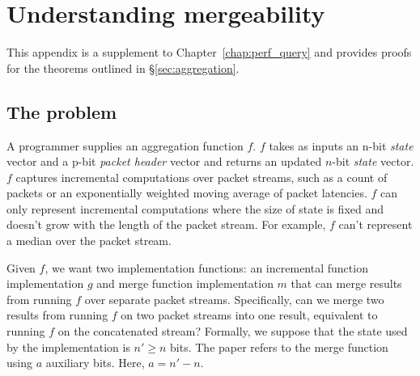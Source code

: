 \chapter{Understanding mergeability}
\label{s:app:merge}

%

This appendix is a supplement to Chapter~\ref{chap:perf_query} and provides
proofs for the theorems outlined in \S\ref{sec:aggregation}.

\section{The problem}

A programmer supplies an aggregation function $f$. $f$ takes as inputs an n-bit \emph{state}
vector and a p-bit \emph{packet header} vector and returns an updated $n$-bit
\emph{state} vector. $f$ captures incremental computations over packet streams,
such as a count of packets or an exponentially weighted moving average of
packet latencies. $f$ can only represent incremental computations where the
size of state is fixed and doesn't grow with the length of the packet stream.
For example, $f$ can't represent a median over the packet stream.

Given $f$, we want two implementation functions: an incremental function implementation $g$
 and merge function implementation $m$ that can merge results from
running $f$ over separate packet streams. Specifically, can we merge
two results from running $f$ on two packet streams into one result,
equivalent to running $f$ on the concatenated stream? Formally, we suppose that the state used by
the implementation is $n' \geq n$ bits. The paper refers to the merge function using $a$ auxiliary bits.
Here, $a = n' - n$. 


